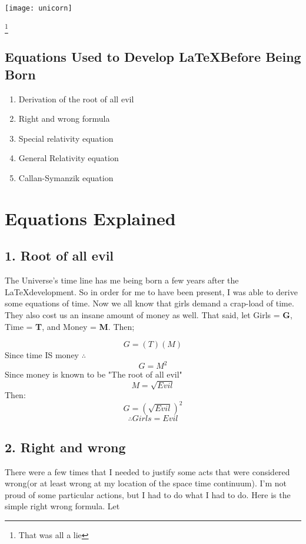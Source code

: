 \documentclass[12pt,twocolumn]{article}
\begin{document}
\texttt{[image: unicorn]}

\footnote{That was all a lie}

\begin{center}
\section*{Equations Used to Develop \LaTeX Before Being Born}
  \begin{enumerate}
    \item Derivation of the root of all evil
    \item Right and wrong formula
   	\item Special relativity equation
   	\item General Relativity equation
   	\item Callan-Symanzik equation
  \end{enumerate}
\end{center}

\section*{Equations Explained}
 
\subsection*{1. Root of all evil}
\indent \indent The Universe's time line has me being born a few years after the \LaTeX development. So in order for me to have been present, I was able to derive some equations of time. Now we all know that girls demand a crap-load of time. They                     also cost us an insane amount of money as well. That said, let Girls = \textbf{G}, Time = \textbf{T}, and Money = \textbf{M}. Then;

  $$G=(T)(M)$$  
  Since time IS money $\therefore $
  $$G=M^2$$
  Since money is known to be "The root of all evil"
  $$M=\sqrt{Evil}$$
  Then:
  $$G=(\sqrt{Evil})^2$$
  $$\therefore Girls=Evil$$

\subsection*{2. Right and wrong}
\indent \indent There were a few times that I needed to justify some acts that were considered wrong(or at least wrong at my location of the space time continuum). I'm not proud of some particular actions, but I had to do what I had to do. Here is the simple right wrong formula. Let
\end{document}
